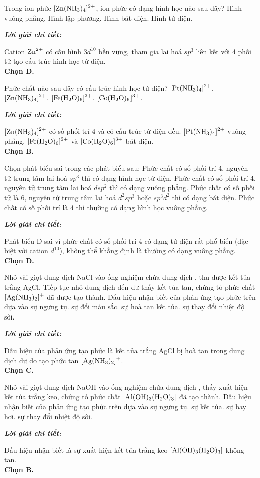 \documentclass[11pt,a4paper]{article}
\def\loigiai#1{
\par\begingroup\color{blue!80!black}\small
\noindent\textbf{\textit{Lời giải chi tiết:}}\par
#1\par\endgroup}
\begin{document}
\begin{ex}
Trong ion phức $\ce{[Zn(NH3)4]^2+}$, ion phức có dạng hình học nào sau đây?
\choice
{Hình vuông phẳng.}
{Hình lập phương.}
{Hình bát diện.}
{\True Hình tứ diện.}
\loigiai{
Cation $\ce{Zn^2+}$ có cấu hình $3d^{10}$ bền vững, tham gia lai hoá $sp^3$ liên kết với 4 phối tử \ce{NH3} tạo cấu trúc hình học tứ diện.\\
\textbf{Chọn D.}}
\end{ex}

\begin{ex}
Phức chất nào sau đây có cấu trúc hình học tứ diện?
\choice
{$\ce{[Pt(NH3)4]^2+}$.}
{\True $\ce{[Zn(NH3)4]^2+}$.}
{$\ce{[Fe(H2O)6]^2+}$.}
{$\ce{[Co(H2O)6]^3+}$.}
\loigiai{
$\ce{[Zn(NH3)4]^2+}$ có số phối trí 4 và có cấu trúc tứ diện đều. $\ce{[Pt(NH3)4]^2+}$ vuông phẳng. $\ce{[Fe(H2O)6]^2+}$ và $\ce{[Co(H2O)6]^3+}$ bát diện.\\
\textbf{Chọn B.}}
\end{ex}

\begin{ex}
Chọn phát biểu sai trong các phát biểu sau:
\choice
{Phức chất có số phối trí 4, nguyên tử trung tâm lai hoá $sp^3$ thì có dạng hình học tứ diện.}
{Phức chất có số phối trí 4, nguyên tử trung tâm lai hoá $dsp^2$ thì có dạng vuông phẳng.}
{Phức chất có số phối tử là 6, nguyên tử trung tâm lai hoá $d^2sp^3$ hoặc $sp^3d^2$ thì có dạng bát diện.}
{\True Phức chất có số phối trí là 4 thì thường có dạng hình học vuông phẳng.}
\loigiai{
Phát biểu D sai vì phức chất có số phối trí 4 có dạng tứ diện rất phổ biến (đặc biệt với cation $d^{10}$), không thể khẳng định là thường có dạng vuông phẳng.\\
\textbf{Chọn D.}}
\end{ex}



\begin{ex}
Nhỏ vài giọt dung dịch NaCl vào ống nghiệm chứa dung dịch , thu được kết tủa trắng AgCl. Tiếp tục nhỏ dung dịch  đến dư thấy kết tủa tan, chứng tỏ phức chất $\ce{[Ag(NH3)2]+}$ đã được tạo thành. Dấu hiệu nhận biết của phản ứng tạo phức trên dựa vào
\choice
{sự ngưng tụ.}
{sự đổi màu sắc.}
{\True sự hoà tan kết tủa.}
{sự thay đổi nhiệt độ sôi.}
\loigiai{
Dấu hiệu của phản ứng tạo phức là kết tủa trắng AgCl bị hoà tan trong dung dịch \ce{NH3} dư do tạo phức tan $\ce{[Ag(NH3)2]+}$.\\
\textbf{Chọn C.}}
\end{ex}

\begin{ex}
Nhỏ vài giọt dung dịch NaOH vào ống nghiệm chứa dung dịch , thấy xuất hiện kết tủa trắng keo, chứng tỏ phức chất $\ce{[Al(OH)3(H2O)3]}$ đã tạo thành. Dấu hiệu nhận biết của phản ứng tạo phức trên dựa vào
\choice
{sự ngưng tụ.}
{\True sự kết tủa.}
{sự bay hơi.}
{sự thay đổi nhiệt độ sôi.}
\loigiai{
Dấu hiệu nhận biết là sự xuất hiện kết tủa trắng keo $\ce{[Al(OH)3(H2O)3]}$ không tan.\\
\textbf{Chọn B.}}
\end{ex}
\end{document}
